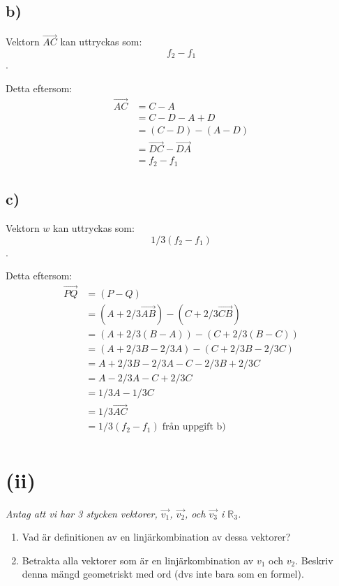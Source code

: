 \documentclass[a4paper, 11pt]{article}
\begin{document}
\subsection*{b)}

Vektorn $\overrightarrow{AC}$ kan uttryckas som: $$f_2 - f_1$$.

Detta eftersom:
\begin{align}
  \overrightarrow{AC} &= C - A \\
  &= C - D - A + D \\
  &= (C -D) - (A - D)\\
  &= \overrightarrow{DC} - \overrightarrow{DA}\\
  &= f_2 - f_1
\end{align}


\subsection*{c)}

Vektorn $w$ kan uttryckas som: $$1/3 (f_2 - f_1)$$.

Detta eftersom:
\begin{align}
  \overrightarrow{PQ} &= (P - Q) \\
  &= (A + 2/3 \overrightarrow{AB}) - (C + 2/3 \overrightarrow{CB}) \\
  &= (A + 2/3 (B - A)) - (C + 2/3 (B - C)) \\
  &= (A + 2/3 B - 2/3 A) - (C + 2/3 B - 2/3 C) \\
  &= A + 2/3 B - 2/3 A - C - 2/3 B + 2/3 C \\  
  &= A - 2/3 A - C + 2/3C \\
  &= 1/3 A - 1/3 C\\
  &= 1/3 \overrightarrow{AC}\\
  &= 1/3 (f_2 - f_1) \; \text{från uppgift b)}\\ 
\end{align}



\section*{(ii)}

{\em Antag att vi har 3 stycken vektorer, $\vec{v_1}$, $\vec{v_2}$, och $\vec{v_3}$ i $\mathbb{R}_3$.




\begin{enumerate}[label=(\alph*)]
  \item Vad är definitionen av en linjärkombination av dessa vektorer?

  \item Betrakta alla vektorer som är en linjärkombination av $v_1$ och
    $v_2$. Beskriv denna mängd geometriskt med ord (dvs inte bara som en
    formel).
\end{enumerate}
}
\end{document}
